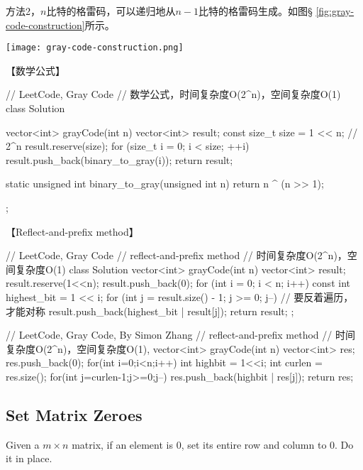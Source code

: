 方法2，$n$比特的格雷码，可以递归地从$n-1$比特的格雷码生成。如图\S
\ref{fig:gray-code-construction}所示。

\begin{center}
	\texttt{[image: gray-code-construction.png]}\\
	\label{fig:gray-code-construction}
\end{center}


【数学公式】
\begin{Code}
	// LeetCode, Gray Code
	// 数学公式，时间复杂度O(2^n)，空间复杂度O(1)
	class Solution {
		vector<int> grayCode(int n) {
			vector<int> result;
			const size_t size = 1 << n;  // 2^n
			result.reserve(size);
			for (size_t i = 0; i < size; ++i)
				result.push_back(binary_to_gray(i));
			return result;
		}

		static unsigned int binary_to_gray(unsigned int n) {
			return n ^ (n >> 1);
		}
	};
\end{Code}

【Reflect-and-prefix method】
\begin{Code}
	// LeetCode, Gray Code
	// reflect-and-prefix method
	// 时间复杂度O(2^n)，空间复杂度O(1)
	class Solution {
		vector<int> grayCode(int n) {
			vector<int> result;
			result.reserve(1<<n);
			result.push_back(0);
			for (int i = 0; i < n; i++) {
				const int highest_bit = 1 << i;
				for (int j = result.size() - 1; j >= 0; j--) // 要反着遍历，才能对称
					result.push_back(highest_bit | result[j]);
			}
			return result;
		}
	};
\end{Code}

\begin{Code}
	// LeetCode, Gray Code, By Simon Zhang
	// reflect-and-prefix method
	// 时间复杂度O(2^n)，空间复杂度O(1),
	vector<int> grayCode(int n) {
		vector<int> res;
		res.push_back(0);
		for(int i=0;i<n;i++){
			int highbit = 1<<i;
			int curlen = res.size();
			for(int j=curlen-1;j>=0;j--)
			res.push_back(highbit | res[j]);
		}
		return res;
	}
\end{Code}



\subsection{Set Matrix Zeroes} %
\label{sec:set-matrix-zeroes}



Given a $m \times n$ matrix, if an element is 0, set its entire row and column
to 0. Do it in place.

